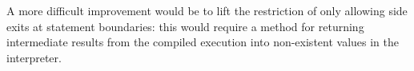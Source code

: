 \documentclass[journal,comsoc]{IEEEtran}
\begin{document}
A more difficult improvement would be to lift the restriction of only allowing side exits at statement boundaries: this would require a method for returning intermediate results from the compiled execution into non-existent values in the interpreter.







%


\ifCLASSOPTIONcaptionsoff
  \newpage
\fi





%
%
%

\printbibliography

% 
\end{document}
